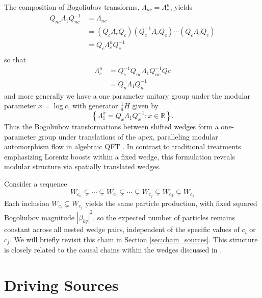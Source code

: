 \documentclass[12pt,a4paper]{article}
\begin{document}
The composition of Bogoliubov transforms, $\Lambda_{nc} = \Lambda_c^n$, yields
\begin{equation}
  \begin{array}{ll}    
    Q_{nc} \Lambda_1 Q_{nc}^{-1}  &= \Lambda_{nc} \\
         &= \left(Q_c \Lambda_{c} Q_c\right) \left( Q_c^{-1} \Lambda_{c} Q_c\right) \cdots \left(Q_c \Lambda_{c} Q_c\right) \\
  &= Q_c \Lambda_c^n Q_c^{-1} \\
  \end{array}
\end{equation}
so that
\begin{equation}
  \begin{array}{ll}
  \Lambda_c^n &= Q_c^{-1} Q_{nc} \Lambda_1 Q_{nc}^{-1} Q{c} \\
  &= Q_n \Lambda_1 Q_n^{-1}
  \end{array}
\end{equation}
and more generally we have a one parameter unitary group under the modular parameter $x = \log c$, with generator $\frac{1}{a} H$ given by
\begin{equation}
  \left\{\Lambda_1^x = Q_x \Lambda_1 Q_x^{-1} : x \in \mathbb{R} \right\}.
\end{equation}
Thus the Bogoliubov transformations between shifted wedges form a one-parameter group under translations of the apex, paralleling modular automorphism flow in algebraic QFT \cite{borchers2000revolutionizing}. In contrast to traditional treatments emphasizing Lorentz boosts within a fixed wedge, this formulation reveals modular structure via spatially translated wedges.

Consider a sequence
\begin{equation}
  W_{c_n} \subsetneq \cdots \subsetneq W_{c_i} \subsetneq \cdots \subsetneq W_{c_j} \subsetneq W_{c_2} \subsetneq W_{c_1}
  \label{chain}
\end{equation}
Each inclusion $W_{c_i} \subsetneq W_{c_j}$ yields the same particle production, with fixed squared Bogoliubov magnitude $|\beta_{kq}|^2$, so the expected number of particles remains constant across all nested wedge pairs, independent of the specific values of $c_i$ or $c_j$. We will briefly revisit this chain in Section \ref{sec:chain_sources}. This structure is closely related to the causal chains within the wedges discussed in \cite{Svidzinsky2024MinkowskiVEA}.

\section{Driving Sources} \label{sec:drive}
\end{document}
